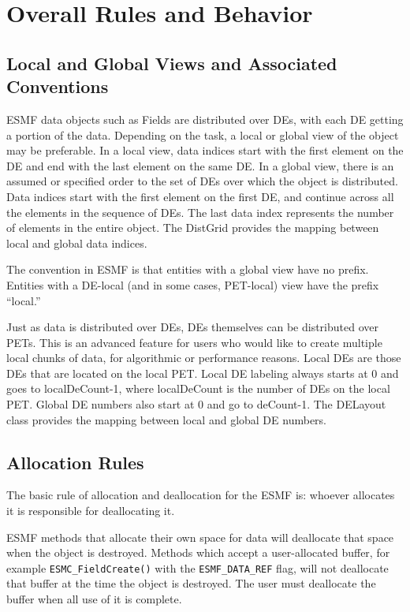 \section{Overall Rules and Behavior}

\subsection{Local and Global Views and Associated Conventions}

ESMF data objects such as Fields are distributed over
DEs, with each DE getting a portion of the data.  Depending
on the task, a local or global view of the object may be
preferable.  In a local view, data indices start with the first
element on the DE and end with the last element on the same DE.
In a global view, there is an assumed or specified order to
the set of DEs over which the object is distributed.  Data
indices start with the first element on the first DE, and
continue across all the elements in the sequence of DEs.
The last data index represents the number of elements in the
entire object.  The DistGrid provides the mapping between
local and global data indices.

The convention in ESMF is that entities with a global view
have no prefix.  Entities with a DE-local (and in some cases,
PET-local) view have the prefix ``local.''

Just as data is distributed over DEs, DEs themselves can be
distributed over PETs.  This is an advanced feature for users
who would like to create multiple local chunks of data, for
algorithmic or performance reasons.
Local DEs are those DEs that are located on the local PET.
Local DE labeling always starts at 0 and goes to localDeCount-1,
where localDeCount is the number of DEs on the local PET.
Global DE numbers also start at 0 and go to deCount-1.
The DELayout class provides the mapping between local
and global DE numbers. 

\subsection{Allocation Rules}

The basic rule of allocation and deallocation for the ESMF is:
whoever allocates it is responsible for deallocating it.

ESMF methods that allocate their own space for data will
deallocate that space when the object is destroyed. 
Methods which accept a user-allocated buffer, for example
{\tt ESMC\_FieldCreate()} with the {\tt ESMF\_DATA\_REF} flag,
will not deallocate that buffer at the time the object is
destroyed.  The user must deallocate the buffer
when all use of it is complete.

